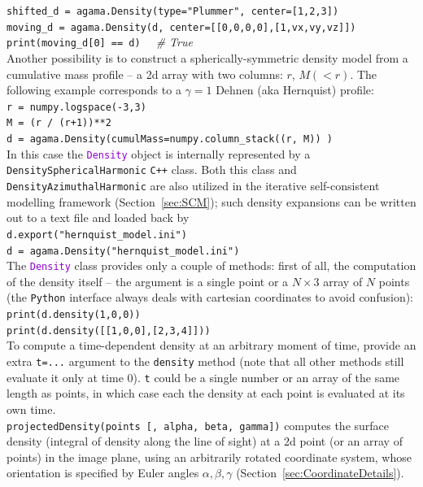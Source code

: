 \documentclass[12pt]{article}
\newcommand{\Cpp}  {\texttt{C++}\xspace}
\newcommand{\Python}{\texttt{Python}\xspace}
\newcommand{\ttt}[1]{\textcolor{darkviolet}{\texttt{#1}}}
\newcommand{\ppp}[1]{\textcolor{darkolive} {\texttt{#1}}}
\begin{document}
\texttt{shifted_d = agama.Density(type="Plummer", center=[1,2,3])\\
moving_d = agama.Density(d, center=[[0,0,0,0],[1,vx,vy,vz]])\\
print(moving_d[0] == d)}\textit{\color{Sepia} \ \ \# True}\\[2mm]
Another possibility is to construct a spherically-symmetric density model from a cumulative mass profile -- a 2d array with two columns: $r$, $M(<r)$. The following example corresponds to a $\gamma=1$ Dehnen (aka Hernquist) profile:\\
\texttt{r = numpy.logspace(-3,3)}\\
\texttt{M = (r / (r+1))**2}\\
\texttt{d = agama.Density(cumulMass=numpy.column_stack((r, M)) )}\\[2mm]
In this case the \ttt{Density} object is internally represented by a \ppp{DensitySphericalHarmonic} \Cpp class. Both this class and \ppp{DensityAzimuthalHarmonic} are also utilized in the iterative self-consistent modelling framework (Section~\ref{sec:SCM}); such density expansions can be written out to a text file and loaded back by\\
\texttt{d.export("hernquist_model.ini")}\\
\texttt{d = agama.Density("hernquist_model.ini")}\\[2mm]
The \ttt{Density} class provides only a couple of methods: first of all, the computation of the density itself -- the argument is a single point or a $N\times3$ array of $N$ points (the \Python interface always deals with cartesian coordinates to avoid confusion):\\
\texttt{print(d.density(1,0,0))}\\
\texttt{print(d.density([[1,0,0],[2,3,4]]))}\\
To compute a time-dependent density at an arbitrary moment of time, provide an extra \texttt{t=...} argument to the \texttt{density} method (note that all other methods still evaluate it only at time 0). \texttt{t} could be a single number or an array of the same length as points, in which case each the density at each point is evaluated at its own time.\\[2mm]
\texttt{projectedDensity(points [, alpha, beta, gamma])} computes the surface density (integral of density along the line of sight) at a 2d point (or an array of points) in the image plane, using an arbitrarily rotated coordinate system, whose orientation is specified by Euler angles $\alpha, \beta, \gamma$ (Section~\ref{sec:CoordinateDetails}).\\[2mm]
\end{document}
